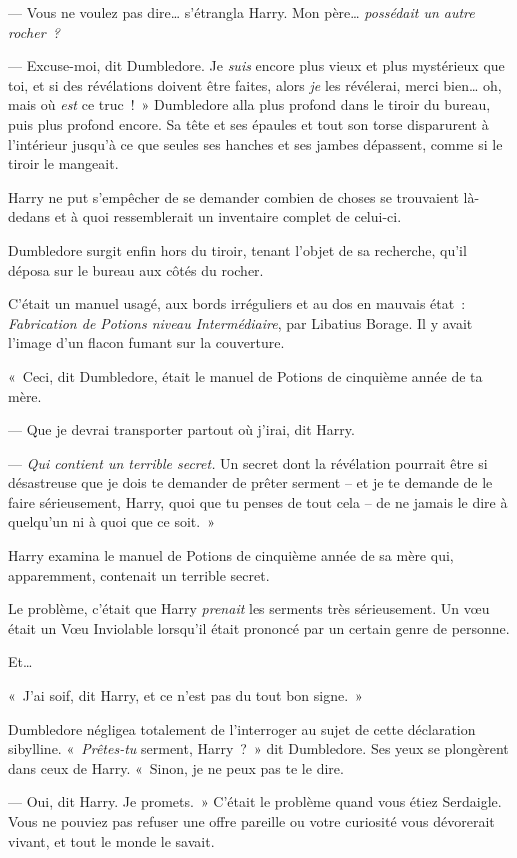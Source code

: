 --- Vous ne voulez pas dire… s'étrangla Harry.
Mon père…
\emph{possédait un autre rocher~?}

--- Excuse-moi, dit Dumbledore.
Je \emph{suis} encore plus vieux et plus mystérieux que toi, et si des révélations doivent être faites, alors \emph{je} les révélerai, merci bien… oh, mais où \emph{est} ce truc~!~»
Dumbledore alla plus profond dans le tiroir du bureau, puis plus profond encore.
Sa tête et ses épaules et tout son torse disparurent à l'intérieur jusqu'à ce que seules ses hanches et ses jambes dépassent, comme si le tiroir le mangeait.

Harry ne put s'empêcher de se demander combien de choses se trouvaient là-dedans et à quoi ressemblerait un inventaire complet de celui-ci.

Dumbledore surgit enfin hors du tiroir, tenant l'objet de sa recherche, qu'il déposa sur le bureau aux côtés du rocher.

C'était un manuel usagé, aux bords irréguliers et au dos en mauvais état~: \emph{Fabrication de Potions niveau Intermédiaire}, par Libatius Borage.
Il y avait l'image d'un flacon fumant sur la couverture.

«~Ceci, dit Dumbledore, était le manuel de Potions de cinquième année de ta mère.

--- Que je devrai transporter partout où j'irai, dit Harry.

--- \emph{Qui contient un terrible secret.} Un secret dont la révélation pourrait être si désastreuse que je dois te demander de prêter serment -- et je te demande de le faire sérieusement, Harry, quoi que tu penses de tout cela -- de ne jamais le dire à quelqu'un ni à quoi que ce soit.~»

Harry examina le manuel de Potions de cinquième année de sa mère qui, apparemment, contenait un terrible secret.

Le problème, c'était que Harry \emph{prenait} les serments très sérieusement.
Un vœu était un Vœu Inviolable lorsqu'il était prononcé par un certain genre de personne.

Et…

«~J'ai soif, dit Harry, et ce n'est pas du tout bon signe.~»

Dumbledore négligea totalement de l'interroger au sujet de cette déclaration sibylline.
«~\emph{Prêtes-tu} serment, Harry~?~»
dit Dumbledore.
Ses yeux se plongèrent dans ceux de Harry.
«~Sinon, je ne peux pas te le dire.

--- Oui, dit Harry.
Je promets.~»
C'était le problème quand vous étiez Serdaigle.
Vous ne pouviez pas refuser une offre pareille ou votre curiosité vous dévorerait vivant, et tout le monde le savait.

